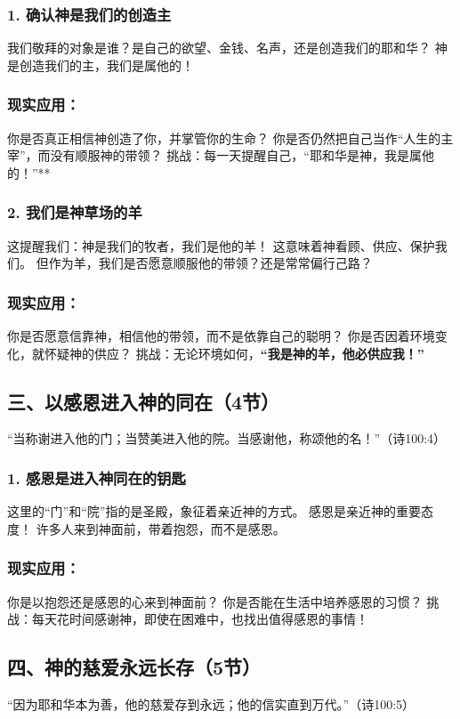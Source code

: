 \documentclass[a4paper, 12pt]{article}
\begin{document}
\subsubsection*{1. 确认神是我们的创造主}
我们敬拜的对象是谁？是自己的欲望、金钱、名声，还是创造我们的耶和华？
神是创造我们的主，我们是属他的！
\subsubsection*{现实应用：}

你是否真正相信神创造了你，并掌管你的生命？
你是否仍然把自己当作“人生的主宰”，而没有顺服神的带领？
挑战：每一天提醒自己，“耶和华是神，我是属他的！”**

\subsubsection*{2. 我们是神草场的羊}
这提醒我们：神是我们的牧者，我们是他的羊！
这意味着神看顾、供应、保护我们。
但作为羊，我们是否愿意顺服他的带领？还是常常偏行己路？
\subsubsection*{现实应用：}

你是否愿意信靠神，相信他的带领，而不是依靠自己的聪明？
你是否因着环境变化，就怀疑神的供应？
挑战：无论环境如何，\textbf{“我是神的羊，他必供应我！”}

\subsection*{三、以感恩进入神的同在（4节）}
“当称谢进入他的门；当赞美进入他的院。当感谢他，称颂他的名！”（诗100:4）

\subsubsection*{1. 感恩是进入神同在的钥匙}
这里的“门”和“院”指的是圣殿，象征着亲近神的方式。
感恩是亲近神的重要态度！
许多人来到神面前，带着抱怨，而不是感恩。
\subsubsection*{现实应用：}

你是以抱怨还是感恩的心来到神面前？
你是否能在生活中培养感恩的习惯？
挑战：每天花时间感谢神，即使在困难中，也找出值得感恩的事情！

\subsection*{四、神的慈爱永远长存（5节）}
“因为耶和华本为善，他的慈爱存到永远；他的信实直到万代。”（诗100:5）
\end{document}
